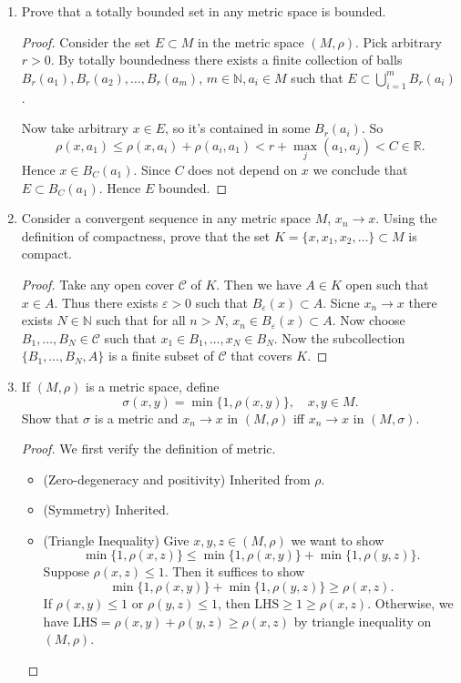 \begin{enumerate}
		\begin{proof}
			No. Consider the discrete metric space and the ball $B_{\frac{1}{2}}(a) = \{a\} $. Then we must have $\text{diam }B_{\frac{1}{2}}(a) = 0 < \frac{1}{2}$.
		\end{proof}
	\item Prove that a totally bounded set in any metric space is bounded.
		\begin{proof}
			Consider the set $E \subset M$ in the metric space $(M, \rho)$. Pick arbitrary $r > 0$. By totally boundedness there exists a finite collection of balls $B_r(a_1), B_r(a_2), \ldots, B_r(a_m)$, $m \in \mathbb{N}, a_i \in M$ such that $E \subset \bigcup_{i = 1} ^m B_r(a_i)$.

			Now take arbitrary $x \in E$, so it's contained in some $B_r(a_i)$. So
			\[
			\rho(x, a_1) \le \rho(x, a_i) + \rho(a_i, a_1) < r + \max_j(a_1, a_j) < C \in \mathbb{R}
			.\] 
			Hence $x \in B_C(a_1)$. Since $C$ does not depend on $x$ we conclude that $E \subset B_C(a_1)$. Hence $E$ bounded.
		\end{proof}
		
	\item Consider a convergent sequence in any metric space $M$, $x_n \to  x$. Using the definition of compactness, prove that the set $K = \{x, x_1, x_2, \ldots\} \subset M$ is compact.
		\begin{proof}
			Take any open cover $\mathcal{C}$ of $K$. Then we have $A \in K$ open such that $x \in A$. Thus there exists $\varepsilon > 0$ such that $B_\varepsilon(x) \subset A$. Sicne $x_n \to x$ there exists $N \in \mathbb{N}$ such that for all $n > N$, $x_n \in B_\varepsilon(x) \subset A$. Now choose $B_1, \ldots, B_{N}\in \mathcal{C}$ such that $x_1 \in B_1, \ldots, x_{N} \in B_{N}$. Now the subcollection $\{B_1, \ldots, B_{N}, A\} $ is a finite subset of $\mathcal{C}$ that covers $K$.
		\end{proof}
		
	\item If $(M, \rho)$ is a metric space, define
		\[
			\sigma(x, y) = \min \{1, \rho(x, y)\} , \quad x, y \in M
		.\] 
		Show that $\sigma$ is a metric and $x_n \to  x$ in $(M, \rho)$ iff $x_n \to  x$ in $(M, \sigma)$.
		
		\begin{proof}
			We first verify the definition of metric.
			\begin{itemize}
				\item (Zero-degeneracy and positivity) Inherited from $\rho$.
				\item (Symmetry) Inherited.
				\item (Triangle Inequality) Give $x, y, z \in (M, \rho)$ we want to show
					\[
						\min \{1, \rho(x, z)\}  \le  \min \{1, \rho(x, y)\} + \min \{1, \rho(y, z)\}
					.\] 
				Suppose $\rho(x, z) \le 1$. Then it suffices to show
				\[
					\min \{1, \rho(x, y)\} + \min \{1, \rho(y, z)\} \ge \rho(x, z)
				.\] 
				If $\rho(x, y) \le  1$ or $\rho(y, z) \le  1$, then $\text{LHS} \ge 1 \ge \rho(x, z)$. Otherwise, we have $\text{LHS} = \rho(x, y) + \rho(y, z) \ge \rho(x, z)$ by triangle inequality on $(M, \rho)$.


\end{itemize}
\end{proof}
\end{enumerate}

